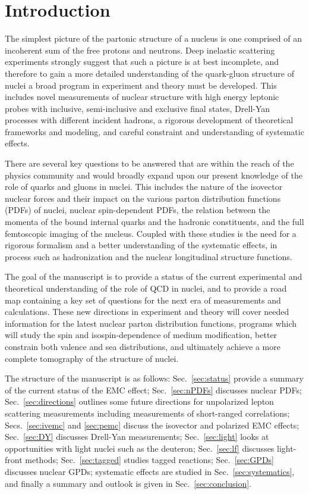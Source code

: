 \section{Introduction}

The simplest picture of the partonic structure of a nucleus is one comprised of an incoherent sum of the free protons and neutrons. Deep inelastic scattering experiments strongly suggest that such a picture is at best incomplete, and therefore to gain a more detailed understanding of the quark-gluon structure of nuclei a broad program in experiment and theory must be developed.  This includes novel measurements of nuclear structure with high energy leptonic probes with inclusive, semi-inclusive and exclusive final states, Drell-Yan processes with different incident hadrons, a rigorous development of theoretical frameworks and modeling, and careful constraint and understanding of systematic effects.

There are several key questions to be answered that are within the reach of the physics community and would broadly expand upon our present knowledge of the role of quarks and gluons in nuclei.  This includes the nature of the isovector nuclear forces and their impact on the various parton distribution functions (PDFs) of nuclei, nuclear spin-dependent PDFs, the relation between the momenta of the bound internal quarks and the hadronic constituents, and the full femtoscopic imaging of the nucleus.  Coupled with these studies is the need for a rigorous formalism and a better understanding of the systematic effects, in process such as hadronization and the nuclear longitudinal structure functions. 

The goal of the manuscript is to provide a status of the current experimental and theoretical understanding of the role of QCD in nuclei, and to provide a road map containing a key set of questions for the next era of measurements and calculations. These new directions in experiment and theory will cover needed information for the latest nuclear parton distribution functions, programs which will study the spin and isospin-dependence of medium modification, better constrain both valence and sea distributions, and ultimately achieve a more complete tomography of the structure of nuclei. 

The structure of the manuscript is as follows: Sec.~\ref{sec:status} provide a summary of the current status of the EMC effect; Sec.~\ref{sec:nPDFs} discusses nuclear PDFs; Sec.~\ref{sec:directions} outlines some future directions for unpolarized lepton scattering measurements including measurements of short-ranged correlations; Secs.~\ref{sec:ivemc} and \ref{sec:pemc} discuss the isovector and polarized EMC effects; Sec.~\ref{sec:DY} discusses Drell-Yan measurements; Sec.~\ref{sec:light} looks at opportunities with light nuclei such as the deuteron; Sec.~\ref{sec:lf} discusses light-front methods; Sec.~\ref{sec:tagged} studies tagged reactions; Sec.~\ref{sec:GPDs} discusses nuclear GPDs; systematic effects are studied in Sec.~\ref{sec:systematics}, and finally a summary and outlook is given in Sec.~\ref{sec:conclusion}.
